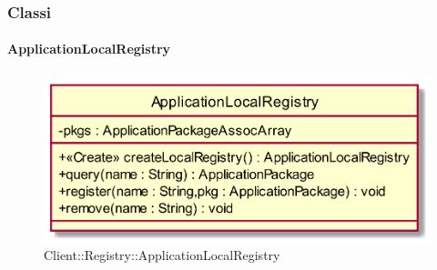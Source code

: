 \subsubsection{Classi}
\hypertarget{ApplicationLocalRegistry_label}{\paragraph{ApplicationLocalRegistry}}
\begin{figure}[h]
	\centering
	\includegraphics[width=\textwidth,height=\textheight,keepaspectratio]{images/ClassApplicationLocalRegistry.png}
	\caption{Client::Registry::ApplicationLocalRegistry}
\end{figure}
